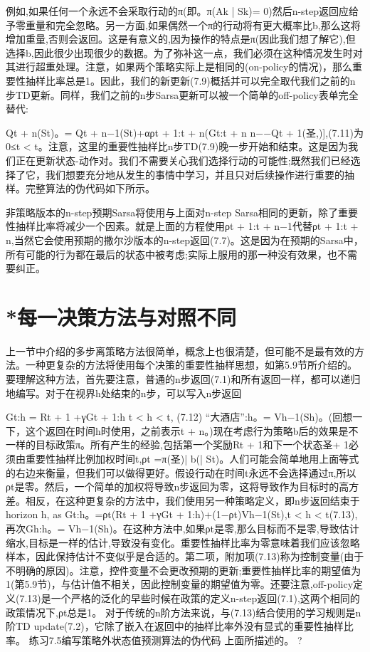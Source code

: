 例如,如果任何一个永远不会采取行动的π(即。π(Ak | Sk)= 0)然后n-step返回应给予零重量和完全忽略。另一方面,如果偶然一个π的行动将有更大概率比b,那么这将增加重量,否则会返回。这是有意义的,因为操作的特点是π(因此我们想了解它),但选择b,因此很少出现很少的数据。为了弥补这一点，我们必须在这种情况发生时对其进行超重处理。注意，如果两个策略实际上是相同的(on-policy的情况)，那么重要性抽样比率总是1。因此，我们的新更新(7.9)概括并可以完全取代我们之前的n步TD更新。同样，我们之前的n步Sarsa更新可以被一个简单的off-policy表单完全替代:

Qt + n(St)。= Qt + n−1(St)+αρt + 1:t + n(Gt:t + n n−−Qt + 1(圣,)],(7.11)为0≤t < t。注意，这里的重要性抽样比n步TD(7.9)晚一步开始和结束。这是因为我们正在更新状态-动作对。我们不需要关心我们选择行动的可能性;既然我们已经选择了它，我们想要充分地从发生的事情中学习，并且只对后续操作进行重要的抽样。完整算法的伪代码如下所示。

非策略版本的n-step预期Sarsa将使用与上面对n-step Sarsa相同的更新，除了重要性抽样比率将减少一个因素。就是上面的方程使用ρt + 1:t + n−1代替ρt + 1:t + n,当然它会使用预期的撒尔沙版本的n-step返回(7.7)。这是因为在预期的Sarsa中，所有可能的行为都在最后的状态中被考虑;实际上服用的那一种没有效果，也不需要纠正。


\section{*每一决策方法与对照不同}

上一节中介绍的多步离策略方法很简单，概念上也很清楚，但可能不是最有效的方法。一种更复杂的方法将使用每个决策的重要性抽样思想，如第5.9节所介绍的。要理解这种方法，首先要注意，普通的n步返回(7.1)和所有返回一样，都可以递归地编写。对于在视界h处结束的n步，可以写入n步返回

Gt:h = Rt + 1 +γGt + 1:h t < h < t, 					(7.12)
“大酒店”:h。= Vh−1(Sh)。(回想一下，这个返回在时间h时使用，之前表示t + n。)现在考虑行为策略b后的效果是不一样的目标政策π。所有产生的经验,包括第一个奖励Rt + 1和下一个状态圣+ 1必须由重要性抽样比例加权时间t,ρt =π(圣)| b(| St)。人们可能会简单地用上面等式的右边来衡量，但我们可以做得更好。假设行动在时间t永远不会选择通过π,所以ρt是零。然后，一个简单的加权将导致n步返回为零，这将导致作为目标时的高方差。相反，在这种更复杂的方法中，我们使用另一种策略定义，即n步返回结束于horizon h, as
Gt:h。=ρt(Rt + 1 +γGt + 1:h)+(1−ρt)Vh−1(St),t < h < t(7.13),再次Gh:h。= Vh−1(Sh)。在这种方法中,如果ρt是零,那么目标而不是零,导致估计缩水,目标是一样的估计,导致没有变化。重要性抽样比率为零意味着我们应该忽略样本，因此保持估计不变似乎是合适的。第二项，附加项(7.13)称为控制变量(由于不明确的原因)。注意，控件变量不会更改预期的更新;重要性抽样比率的期望值为1(第5.9节)，与估计值不相关，因此控制变量的期望值为零。还要注意,off-policy定义(7.13)是一个严格的泛化的早些时候在政策的定义n-step返回(7.1),这两个相同的政策情况下,ρt总是1。
对于传统的n阶方法来说，与(7.13)结合使用的学习规则是n阶TD update(7.2)，它除了嵌入在返回中的抽样比率外没有显式的重要性抽样比率。
练习7.5编写策略外状态值预测算法的伪代码
上面所描述的。 					?

